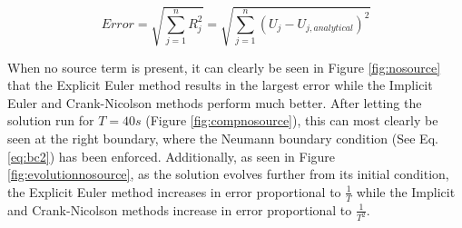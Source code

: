 \documentclass[10pt, letter, showtrims]{extarticle}
\begin{document}
		\begin{equation}
		\label{eq:L2Norm}
			Error = \sqrt{\sum_{j=1}^{n} R_{j}^{2}} = \sqrt{\sum_{j=1}^{n} (U_{j} - U_{j, analytical})^{2}}
		\end{equation}
		
		\pagebreak
		
		\noindent
		When no source term is present, it can clearly be seen in Figure \ref{fig:nosource} that the Explicit Euler method results in the largest error while the Implicit Euler and Crank-Nicolson methods perform much better. After letting the solution run for $T = 40 s$ (Figure \ref{fig:compnosource}), this can most clearly be seen at the right boundary, where the Neumann boundary condition (See Eq. \ref{eq:bc2}) has been enforced. Additionally, as seen in Figure \ref{fig:evolutionnosource}, as the solution evolves further from its initial condition, the Explicit Euler method increases in error proportional to $\frac{1}{T}$ while the Implicit and Crank-Nicolson methods increase in error proportional to $\frac{1}{T^{2}}$.	
		
\end{document}
